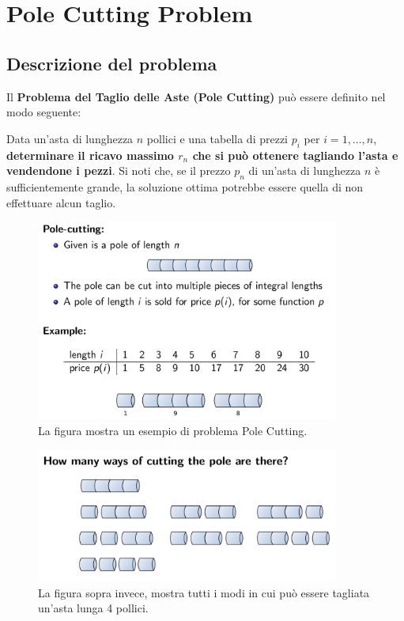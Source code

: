 \chapter{Pole Cutting Problem}

\section{Descrizione del problema}

Il \textbf{Problema del Taglio delle Aste (Pole Cutting)} può essere
definito nel modo seguente:

\begin{myblockquote}
  Data un'asta di lunghezza $n$ pollici e una tabella di prezzi $p_i$
  per $i = 1, \ldots, n$, \textbf{determinare il ricavo massimo $r_n$ che
    si può ottenere tagliando l'asta e vendendone i pezzi}. Si noti che, se
  il prezzo $p_n$ di un'asta di lunghezza $n$ è sufficientemente
  grande, la soluzione ottima potrebbe essere quella di non effettuare
  alcun taglio.
\end{myblockquote}

\begin{figure}[H]
\centering
  \includegraphics[width=10cm, keepaspectratio]{Programmazione_dinamica/imgs/pole1.png}
  \caption{La figura mostra un esempio di problema Pole Cutting.}

\end{figure}

\begin{figure}[H]
  \centering
  \includegraphics[width=10cm, keepaspectratio]{Programmazione_dinamica/imgs/pole2.png}
  \caption{La figura sopra invece, mostra tutti i modi in cui può essere
    tagliata un'asta lunga 4 pollici.}
\end{figure}



